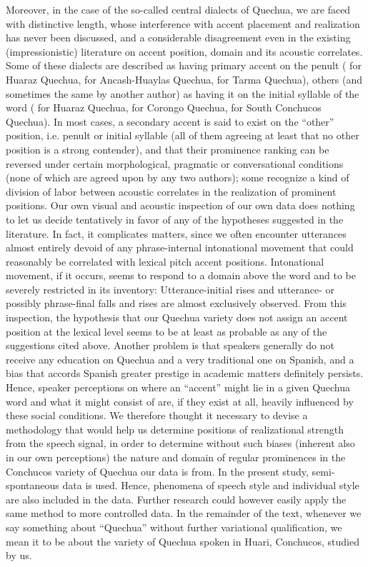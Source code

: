 \documentclass[output=paper]{LSP/langsci}
\begin{document}
Moreover, in the case of the so-called central dialects of Quechua, we are faced with distinctive length, whose interference with accent placement and realization has never been discussed, and a considerable disagreement even in the existing (impressionistic) literature on accent position, domain and its acoustic correlates. Some of these dialects are described as having primary accent on the penult (\citealt{Trager1945} for Huaraz Quechua, \citealt{Parker1976} for Ancash-Huaylas Quechua, \citealt{Adelaar1977} for Tarma Quechua), others (and sometimes the same by another author) as having it on the initial syllable of the word (\citealt{Parker1976} for Huaraz Quechua, \citealt{Hintz2000} for Corongo Quechua, \citealt{Hintz2006} for South Conchucos Quechua). In most cases, a secondary accent is said to exist on the ``other'' position, i.e. penult or initial syllable (all of them agreeing at least that no other position is a strong contender), and that their prominence ranking can be reversed under certain morphological, pragmatic or conversational conditions (none of which are agreed upon by any two authors); some recognize a kind of division of labor between acoustic correlates in the realization of prominent positions. Our own visual and acoustic inspection of our own data does nothing to let us decide tentatively in favor of any of the hypotheses suggested in the literature. In fact, it complicates matters, since we often encounter utterances almost entirely devoid of any phrase-internal intonational movement that could reasonably be correlated with lexical pitch accent positions. Intonational movement, if it occurs, seems to respond to a domain above the word and to be severely restricted in its inventory: Utterance-initial rises and utterance- or possibly phrase-final falls and rises are almost exclusively observed. From this inspection, the hypothesis that our Quechua variety does not assign an accent position at the lexical level seems to be at least as probable as any of the suggestions cited above. Another problem is that speakers generally do not receive any education on Quechua and a very traditional one on Spanish, and a bias that accords Spanish greater prestige in academic matters definitely persists. Hence, speaker perceptions on where an “accent” might lie in a given Quechua word and what it might consist of are, if they exist at all, heavily influenced by these social conditions. We therefore thought it necessary to devise a methodology that would help us determine positions of realizational strength from the speech signal, in order to determine without such biases (inherent also in our own perceptions) the nature and domain of regular prominences in the Conchucos variety of Quechua our data is from. In the present study, semi-spontaneous data is used. Hence, phenomena of speech style and individual style are also included in the data. Further research could however easily apply the same method to more controlled data. In the remainder of the text, whenever we say something about “Quechua” without further variational qualification, we mean it to be about the variety of Quechua spoken in Huari, Conchucos, studied by us.  
\end{document}
